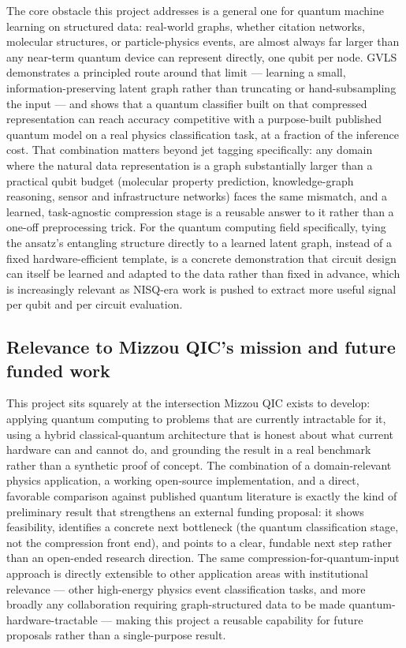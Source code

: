 \documentclass[11pt]{article}
\begin{document}
The core obstacle this project addresses is a general one for quantum
machine learning on structured data: real-world graphs, whether citation
networks, molecular structures, or particle-physics events, are almost
always far larger than any near-term quantum device can represent directly,
one qubit per node. GVLS demonstrates a principled route around that limit
--- learning a small, information-preserving latent graph rather than
truncating or hand-subsampling the input --- and shows that a quantum
classifier built on that compressed representation can reach accuracy
competitive with a purpose-built published quantum model on a real
physics classification task, at a fraction of the inference cost. That
combination matters beyond jet tagging specifically: any domain where the
natural data representation is a graph substantially larger than a
practical qubit budget (molecular property prediction, knowledge-graph
reasoning, sensor and infrastructure networks) faces the same
mismatch, and a learned, task-agnostic compression stage is a reusable
answer to it rather than a one-off preprocessing trick. For the quantum
computing field specifically, tying the ansatz's entangling structure
directly to a learned latent graph, instead of a fixed hardware-efficient
template, is a concrete demonstration that circuit design can itself be
learned and adapted to the data rather than fixed in advance, which is
increasingly relevant as NISQ-era work is pushed to extract more useful
signal per qubit and per circuit evaluation.

\subsection*{Relevance to Mizzou QIC's mission and future funded work}

This project sits squarely at the intersection Mizzou QIC exists to
develop: applying quantum computing to problems that are currently
intractable for it, using a hybrid classical-quantum architecture that is
honest about what current hardware can and cannot do, and grounding the
result in a real benchmark rather than a synthetic proof of concept. The
combination of a domain-relevant physics application, a working
open-source implementation, and a direct, favorable comparison against
published quantum literature is exactly the kind of preliminary result
that strengthens an external funding proposal: it shows feasibility,
identifies a concrete next bottleneck (the quantum classification stage,
not the compression front end), and points to a clear, fundable next step
rather than an open-ended research direction. The same
compression-for-quantum-input approach is directly extensible to other
application areas with institutional relevance --- other high-energy
physics event classification tasks, and more broadly any collaboration
requiring graph-structured data to be made quantum-hardware-tractable
--- making this project a reusable capability for future proposals rather
than a single-purpose result.
\end{document}
